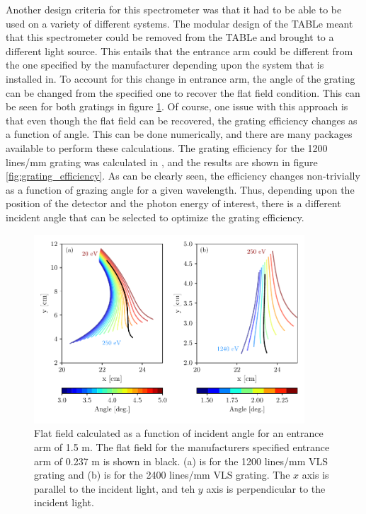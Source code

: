 Another design criteria for this spectrometer was that it had to be able to be used on a variety of different systems.  The modular design of the TABLe meant that this spectrometer could be removed from the TABLe and brought to a different light source.  This entails that the entrance arm could be different from the one specified by the manufacturer depending upon the system that is installed in.  To account for this change in entrance arm, the angle of the grating can be changed from the specified one to recover the flat field condition.  This can be seen for both gratings in figure \ref{fig:variable_flat_field}.  Of course, one issue with this approach is that even though the flat field can be recovered, the grating efficiency changes as a function of angle.  This can be done numerically, and there are many packages available to perform these calculations. The grating efficiency for the 1200 lines/mm grating was calculated in \cite{hageDevelopmentXUVSpectrometer}, and the results are shown in figure \ref{fig:grating_efficiency}.  As can be clearly seen, the efficiency changes non-trivially as a function of grazing angle for a given wavelength.  Thus, depending upon the position of the detector and the photon energy of interest, there is a different incident angle that can be selected to optimize the grating efficiency.
\begin{figure}
	\centering
	\includegraphics[width=0.9\textwidth]{figures/Beamline/variable_flat_field.pdf}
	\caption[Flat field of both VLS gratings as a function of input angle]{Flat field calculated as a function of incident angle for an entrance arm of 1.5 m.  The flat field for the manufacturers specified entrance arm of 0.237 m is shown in black. (a) is for the 1200 lines/mm VLS grating and (b) is for the 2400 lines/mm VLS grating. The $x$ axis is parallel to the incident light, and teh $y$ axis is perpendicular to the incident light.}
	\label{fig:variable_flat_field}
\end{figure}

